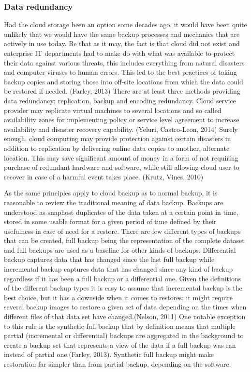 \documentclass{article}
\begin{document}
\subsubsection{Data redundancy}
Had the cloud storage been an option some decades ago, it would have been quite unlikely that we would have the same backup processes and mechanics that are actively in use today. Be that as it may, the fact is that cloud did not exist and enterprise IT departments had to make do with what was available to protect their data against various threats, this includes everything from natural disasters and computer viruses to human errors. This led to the best practices of taking backup copies and storing those into off-site locations from which the data could be restored if needed. (Farley, 2013) 
There are at least three methods providing data redundancy: replication, backup and encoding redundancy. Cloud service provider may replicate virtual machines to several locations and so called availability zones for implementing policy or service level agreement to increase availability and disaster recovery capability. (Yeluri, Castro-Leon, 2014) Surely enough, cloud computing may provide protection against certain disasters in addition to replication by delivering online data copies to another, alternate location. This may save significant amount of money in a form of not requiring purchase of redundant hardware and software, while still allowing cloud user to recover in case of a harmful event takes place. (Krutz, Vines, 2010)
\par
As the same principles apply to cloud backup as to normal backup, it is reasonable to review the traditional meaning of data backup. Backups are understood as snaphost duplicates of the data taken at a certain point in time, stored in some usable format for a given period of time defined by their usefulness in case of need for a restore. There are few different types of backups that can be created, full backup being the representation of the complete dataset and full backups are used as a baseline for other kinds of backups. Differential backup captures data that has changed since the last full backup while incremental backup captures data that has changed since any kind of backup regardless if it has been a full backup or a differential one. Given the definitions of the different backup types it is easy to assume that incremental backup is the best choice, but it has a downside when it comes to restores: it might require several backup images to restore a given set of data depending on the times when different files of that data set have changed.(Nelson, 2011) One notable exception to this rule is the synthetic full backup that by definition means that multiple partial (incremental or differential) backups are aggregated in the background to create a backup set that represents a view of the data if a full backup was ran instead of partial one.(Farley, 2013). Synthetic full backup might make restoration far simpler than from partial backup, depending on the software.
\end{document}
